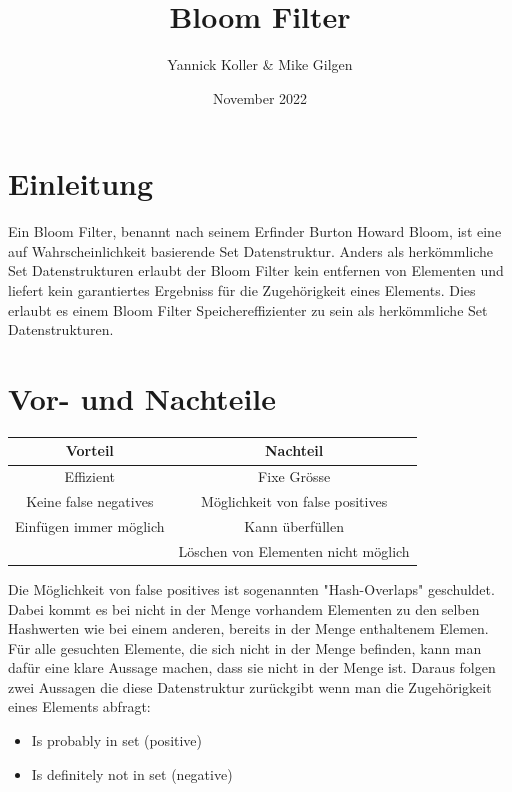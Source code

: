 \documentclass{article}
\title{Bloom Filter}
\author{ Yannick Koller & Mike Gilgen }
\date{November 2022}
\begin{document}
    \maketitle


    \section{Einleitung}
    Ein Bloom Filter, benannt nach seinem Erfinder Burton Howard Bloom, ist eine auf Wahrscheinlichkeit basierende Set Datenstruktur. Anders als herkömmliche Set Datenstrukturen erlaubt der Bloom Filter kein entfernen von Elementen und liefert kein garantiertes Ergebniss für die Zugehörigkeit eines Elements. Dies erlaubt es einem Bloom Filter Speichereffizienter zu sein als herkömmliche Set Datenstrukturen.


    \section{Vor- und Nachteile}
    \begin{center}
        \begin{tabular}{c|c}
            Vorteil                & Nachteil                            \\
            \hline
            Effizient              & Fixe Grösse                         \\
            Keine false negatives  & Möglichkeit von false positives     \\
            Einfügen immer möglich & Kann überfüllen                     \\
            & Löschen von Elementen nicht möglich \\
        \end{tabular}
    \end{center}
    Die Möglichkeit von false positives ist sogenannten "Hash-Overlaps" geschuldet. Dabei kommt es bei nicht in der Menge vorhandem Elementen zu den selben Hashwerten wie bei einem anderen, bereits in der Menge enthaltenem Elemen. Für alle gesuchten Elemente, die sich nicht in der Menge befinden, kann man dafür eine klare Aussage machen, dass sie nicht in der Menge ist. Daraus folgen zwei Aussagen die diese Datenstruktur zurückgibt wenn man die Zugehörigkeit eines Elements abfragt:

    \begin{itemize}
        \item Is probably in set (positive)
        \item Is definitely not in set (negative)
    \end{itemize}
\end{document}
